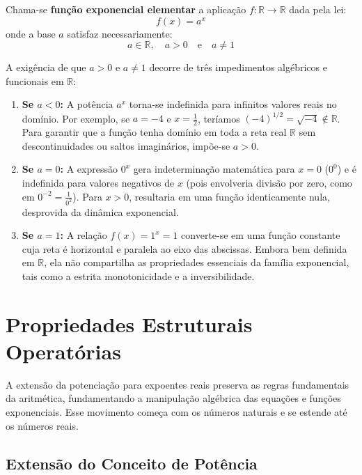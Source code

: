 \documentclass[12pt,a4paper]{report}
\begin{document}
	\begin{destaque}
		\label{dest:def_exp}
		Chama-se \textbf{função exponencial elementar} a aplicação $f: \mathbb{R} \to \mathbb{R}$ dada pela lei:
		$$f(x) = a^x$$
		onde a base $a$ satisfaz necessariamente:
		$$a \in \mathbb{R}, \quad a > 0 \quad \text{e} \quad a \neq 1$$
	\end{destaque}
	
	A exigência de que $a > 0$ e $a \neq 1$ decorre de três impedimentos algébricos e funcionais em $\mathbb{R}$:
	
	\begin{enumerate}
		\item \textbf{Se $a < 0$:} A potência $a^x$ torna-se indefinida para infinitos valores reais no domínio. Por exemplo, se $a = -4$ e $x = \frac{1}{2}$, teríamos $(-4)^{1/2} = \sqrt{-4} \notin \mathbb{R}$. Para garantir que a função tenha domínio em toda a reta real $\mathbb{R}$ sem descontinuidades ou saltos imaginários, impõe-se $a > 0$.
		\item \textbf{Se $a = 0$:} A expressão $0^x$ gera indeterminação matemática para $x = 0$ ($0^0$) e é indefinida para valores negativos de $x$ (pois envolveria divisão por zero, como em $0^{-2} = \frac{1}{0^2}$). Para $x > 0$, resultaria em uma função identicamente nula, desprovida da dinâmica exponencial.
		\item \textbf{Se $a = 1$:} A relação $f(x) = 1^x = 1$ converte-se em uma função constante cuja reta é horizontal e paralela ao eixo das abscissas. Embora bem definida em $\mathbb{R}$, ela não compartilha as propriedades essenciais da família exponencial, tais como a estrita monotonicidade e a inversibilidade.
	\end{enumerate}
	
	\section{Propriedades Estruturais Operatórias}
	\label{subsec:propriedades}
	
	A extensão da potenciação para expoentes reais preserva as regras fundamentais da aritmética, fundamentando a manipulação algébrica das equações e funções exponenciais. Esse movimento começa com os números naturais e se estende até os números reais.

	\subsection{Extensão do Conceito de Potência}
	
\end{document}
